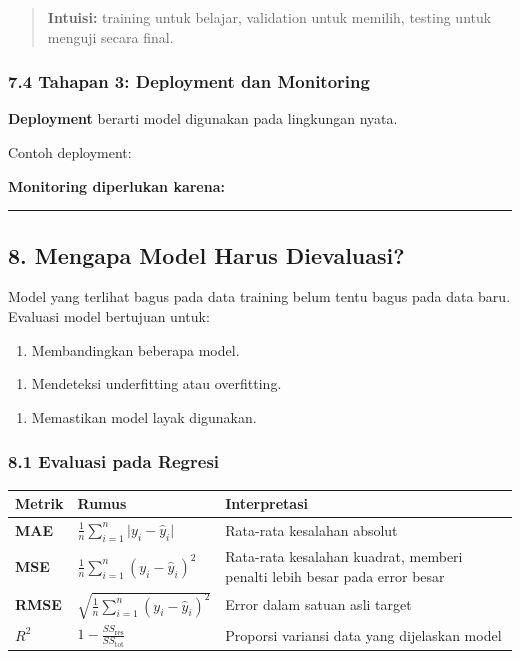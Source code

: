 \documentclass[12pt,a4paper]{article}
\begin{document}
\begin{quote}
\textbf{Intuisi:} training untuk belajar, validation untuk memilih, testing untuk menguji secara final.\end{quote}


\subsubsection{7.4 Tahapan 3: Deployment dan Monitoring}

\textbf{Deployment} berarti model digunakan pada lingkungan nyata.


Contoh deployment:


\textbf{Monitoring diperlukan karena:}


\hrule


\subsection{8. Mengapa Model Harus Dievaluasi?}

Model yang terlihat bagus pada data training belum tentu bagus pada data baru. Evaluasi model bertujuan untuk:


\begin{enumerate}
\item Membandingkan beberapa model.
\end{enumerate}

\begin{enumerate}
\item Mendeteksi underfitting atau overfitting.
\end{enumerate}

\begin{enumerate}
\item Memastikan model layak digunakan.
\end{enumerate}


\subsubsection{8.1 Evaluasi pada Regresi}

\begin{tabular}{|l|l|l|}
\hline
Metrik & Rumus & Interpretasi \\
\hline
\textbf{MAE} & $\frac{1}{n} \sum_{i=1}^{n} \lvert y_i - \hat{y}_i \rvert$ & Rata-rata kesalahan absolut \\
\hline
\textbf{MSE} & $\frac{1}{n} \sum_{i=1}^{n} (y_i - \hat{y}_i)^2$ & Rata-rata kesalahan kuadrat, memberi penalti lebih besar pada error besar \\
\hline
\textbf{RMSE} & $\sqrt{\frac{1}{n} \sum_{i=1}^{n} (y_i - \hat{y}_i)^2}$ & Error dalam satuan asli target \\
\hline
\textbf{$R^2$} & $1 - \frac{SS_{\text{res}}}{SS_{\text{tot}}}$ & Proporsi variansi data yang dijelaskan model \\
\hline
\end{tabular}
\end{document}
